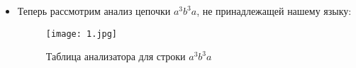\documentclass[12pt]{article}
\begin{document}
\begin{enumerate}
\begin{itemize}
	\item Теперь рассмотрим анализ цепочки $ a^3b^3a $, не принадлежащей нашему языку:
	\begin{figure}[H]
		\centering
		\texttt{[image: 1.jpg]}
		\caption{Таблица анализатора для строки $ a^3b^3a $}
	\end{figure}
	\end{itemize}
	
\end{enumerate}
\end{document}
